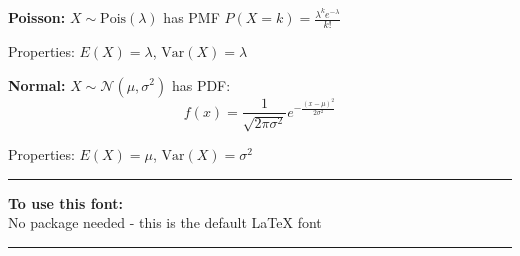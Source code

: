 \documentclass[10pt]{article}
\newcommand{\var}{\textrm{Var}}
\newcommand{\N}{\mathcal{N}}
\newcommand{\Pois}{\textrm{Pois}}
\begin{document}
\textbf{Poisson:} $X \sim \Pois(\lambda)$ has PMF $P(X = k) = \frac{\lambda^k e^{-\lambda}}{k!}$

Properties: $E(X) = \lambda$, $\var(X) = \lambda$

\textbf{Normal:} $X \sim \N(\mu, \sigma^2)$ has PDF:
\[f(x) = \frac{1}{\sqrt{2\pi\sigma^2}} e^{-\frac{(x-\mu)^2}{2\sigma^2}}\]

Properties: $E(X) = \mu$, $\var(X) = \sigma^2$

\vspace{1cm}
\begin{center}
\rule{\textwidth}{0.4pt}

\textbf{To use this font:} \\
No package needed - this is the default LaTeX font

\rule{\textwidth}{0.4pt}
\end{center}
\end{document}
